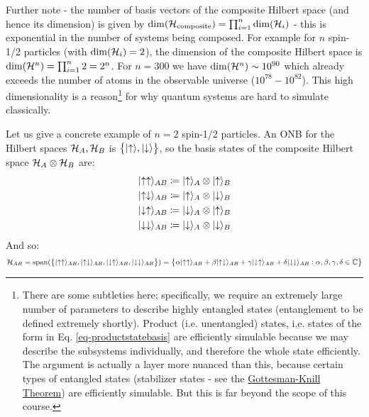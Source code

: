 Further note - the number of basis vectors of the composite Hilbert space (and hence its dimension) is given by $\dim(\mathcal{H}_{\text{composite}}) = \prod_{i=1}^n \dim(\mathcal{H}_i)$ - this is exponential in the number of systems being composed. For example for $n$ spin-1/2 particles (with $\dim(\mathcal{H}_i) = 2$), the dimension of the composite Hilbert space is $\dim(\mathcal{H}^n) = \prod_{i=1}^n 2 = 2^n$. For $n = 300$ we have $\dim(\mathcal{H}^n) \sim 10^{90}$ which already exceeds the number of atoms in the observable universe ($10^{78} - 10^{82}$). This high dimensionality is a reason\footnote{There are some subtleties here; specifically, we require an extremely large number of parameters to describe highly entangled states (entanglement to be defined extremely shortly). Product (i.e. unentangled) states, i.e. states of the form in Eq. \eqref{eq-productstatebasis} are efficiently simulable because we may describe the subsystems individually, and therefore the whole state efficiently. The argument is actually a layer more nuanced than this, because certain types of entangled states (stabilizer states - see the \href{https://en.wikipedia.org/wiki/Gottesman–Knill_theorem}{Gottesman-Knill Theorem}) are efficiently simulable. But this is far beyond the scope of this course.} for why quantum systems are hard to simulate classically.

Let us give a concrete example of $n = 2$ spin-1/2 particles. An ONB for the Hilbert spaces $\mathcal{H}_A, \mathcal{H}_B$ is $\set{\lvert \uparrow \rangle, \lvert \downarrow \rangle}$, so the basis states of the composite Hilbert space $\mathcal{H}_A \otimes \mathcal{H}_B$ are:
\begin{equation}
    \begin{split}
        \lvert \uparrow\uparrow \rangle_{AB} &\coloneqq \lvert \uparrow \rangle_A \otimes \lvert \uparrow \rangle_B
        \\ \lvert \uparrow\downarrow \rangle_{AB} &\coloneqq \lvert \uparrow \rangle_A \otimes \lvert \downarrow \rangle_B
        \\ \lvert \downarrow\uparrow \rangle_{AB} &\coloneqq \lvert \downarrow \rangle_A \otimes \lvert \uparrow \rangle_B
        \\ \lvert \downarrow\downarrow \rangle_{AB} &\coloneqq \lvert \downarrow \rangle_A \otimes \lvert \downarrow \rangle_B
    \end{split}
\end{equation}
And so:
\begin{equation}
    \mathcal{H}_{AB} = \text{span}(\set{\lvert \uparrow\uparrow \rangle_{AB}, \lvert \uparrow\downarrow \rangle_{AB}, \lvert \downarrow\uparrow \rangle_{AB}, \lvert \downarrow\downarrow \rangle_{AB}}) = \set{\alpha\lvert \uparrow\uparrow \rangle_{AB} + \beta\lvert \uparrow\downarrow \rangle_{AB} + \gamma\lvert \downarrow\uparrow \rangle_{AB} + \delta\lvert \downarrow\downarrow \rangle_{AB} : \alpha, \beta, \gamma, \delta \in \mathbb{C}}
\end{equation}

